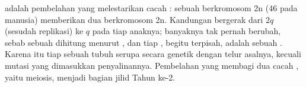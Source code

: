 \begin{proposition}\label{prop:b1:replication-mitosis:conserves}
 adalah pembelahan yang melestarikan cacah : sebuah
 berkromosom 2n (46 pada manusia) memberikan dua  berkromosom 2n.
Kandungan  bergerak dari $2q$ (sesudah replikasi) ke $q$ pada
tiap  anaknya; banyaknya  tak pernah berubah, sebab sebuah
 dihitung menurut , dan tiap , begitu
terpisah, adalah sebuah . Karena itu tiap  sebuah tubuh
serupa secara genetik dengan  telur asalnya, kecuali mutasi yang
dimasukkan penyalinannya. Pembelahan yang membagi dua cacah
, yaitu meiosis, menjadi bagian jilid Tahun ke-2.
\end{proposition}

